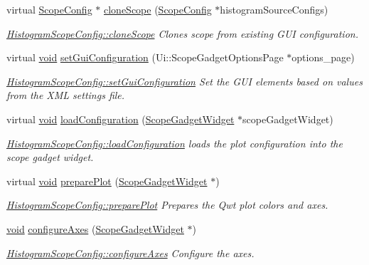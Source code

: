 \begin{DoxyCompactItemize}
virtual \hyperlink{class_scope_config}{\-Scope\-Config} $\ast$ \hyperlink{group___scope_plugin_gaf687cd062ff03c3a6dcf3edb05d29662}{clone\-Scope} (\hyperlink{class_scope_config}{\-Scope\-Config} $\ast$histogram\-Source\-Configs)
\begin{DoxyCompactList}\small\item\em \hyperlink{group___scope_plugin_gaf687cd062ff03c3a6dcf3edb05d29662}{\-Histogram\-Scope\-Config\-::clone\-Scope} \-Clones scope from existing \-G\-U\-I configuration. \end{DoxyCompactList}\item 
virtual \hyperlink{group___u_a_v_objects_plugin_ga444cf2ff3f0ecbe028adce838d373f5c}{void} \hyperlink{group___scope_plugin_ga575b4cb9a8b9a9ad8e236487a3da570b}{set\-Gui\-Configuration} (\-Ui\-::\-Scope\-Gadget\-Options\-Page $\ast$options\-\_\-page)
\begin{DoxyCompactList}\small\item\em \hyperlink{group___scope_plugin_ga575b4cb9a8b9a9ad8e236487a3da570b}{\-Histogram\-Scope\-Config\-::set\-Gui\-Configuration} \-Set the \-G\-U\-I elements based on values from the \-X\-M\-L settings file. \end{DoxyCompactList}\item 
virtual \hyperlink{group___u_a_v_objects_plugin_ga444cf2ff3f0ecbe028adce838d373f5c}{void} \hyperlink{group___scope_plugin_gace592757ce86fefdc0848379d6833748}{load\-Configuration} (\hyperlink{class_scope_gadget_widget}{\-Scope\-Gadget\-Widget} $\ast$scope\-Gadget\-Widget)
\begin{DoxyCompactList}\small\item\em \hyperlink{group___scope_plugin_gace592757ce86fefdc0848379d6833748}{\-Histogram\-Scope\-Config\-::load\-Configuration} loads the plot configuration into the scope gadget widget. \end{DoxyCompactList}\item 
virtual \hyperlink{group___u_a_v_objects_plugin_ga444cf2ff3f0ecbe028adce838d373f5c}{void} \hyperlink{group___scope_plugin_gaaf43bfcb7e79e657acda463cb66d854c}{prepare\-Plot} (\hyperlink{class_scope_gadget_widget}{\-Scope\-Gadget\-Widget} $\ast$)
\begin{DoxyCompactList}\small\item\em \hyperlink{group___scope_plugin_gaaf43bfcb7e79e657acda463cb66d854c}{\-Histogram\-Scope\-Config\-::prepare\-Plot} \-Prepares the \-Qwt plot colors and axes. \end{DoxyCompactList}\item 
\hyperlink{group___u_a_v_objects_plugin_ga444cf2ff3f0ecbe028adce838d373f5c}{void} \hyperlink{group___scope_plugin_ga522d6d5e834566550cacdb1eb24b934f}{configure\-Axes} (\hyperlink{class_scope_gadget_widget}{\-Scope\-Gadget\-Widget} $\ast$)
\begin{DoxyCompactList}\small\item\em \hyperlink{group___scope_plugin_ga522d6d5e834566550cacdb1eb24b934f}{\-Histogram\-Scope\-Config\-::configure\-Axes} \-Configure the axes. \end{DoxyCompactList}\end{DoxyCompactItemize}


